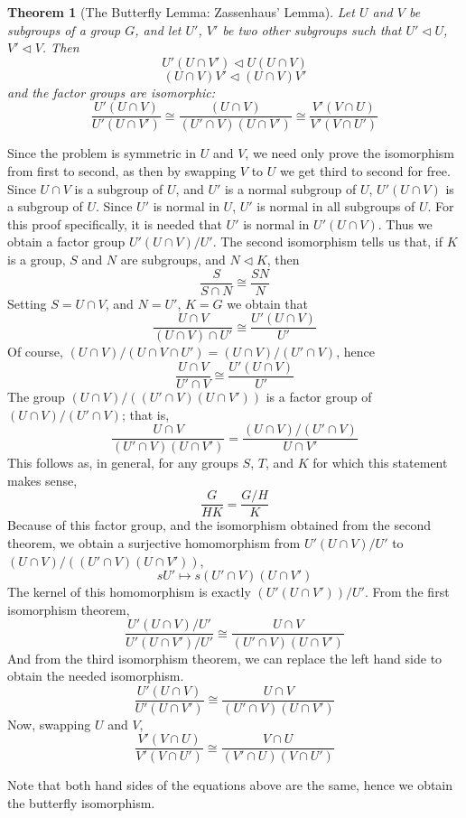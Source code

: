 \documentclass[12pt]{amsbook}
\makeatletter
\theoremstyle{plain}
\newtheorem{theorem}{Theorem}[chapter]
\theoremstyle{definition}
\renewenvironment{proof}[1][\proofname]{\par
  \pushQED{\qed}%
  \normalfont \topsep6\p@\@plus6\p@\relax
  \list{}{\leftmargin=0em
          \rightmargin=\leftmargin
          \settowidth{\itemindent}{\itshape#1}%
          \labelwidth=\itemindent}

  \item[\hskip\labelsep
        \itshape
    #1\@addpunct{.}]\ignorespaces
}{%
  \popQED\endlist\@endpefalse
}
\makeatother
\begin{document}
\begin{theorem}[The Butterfly Lemma: Zassenhaus' Lemma]  
    Let $U$ and $V$ be subgroups of a group $G$, and let $U'$, $V'$ be two other subgroups such that $U' \lhd U$, $V' \lhd V$. Then
    \[ U'(U \cap V') \lhd U(U \cap V) \]
    \[ (U \cap V)V' \lhd (U \cap V)V' \]
    and the factor groups are isomorphic:
    \[ \frac{U'(U \cap V)}{U'(U \cap V')} \cong \frac{(U \cap V)}{(U' \cap V)(U \cap V')} \cong \frac{V'(V \cap U)}{V'(V \cap U')} \]
\end{theorem}
\begin{proof}
    Since the problem is symmetric in $U$ and $V$, we need only prove the isomorphism from first to second, as then by swapping $V$ to $U$ we get third to second for free. Since $U \cap V$ is a subgroup of $U$, and $U'$ is a normal subgroup of $U$, $U'(U \cap V)$ is a subgroup of $U$. Since $U'$ is normal in $U$, $U'$ is normal in all subgroups of $U$. For this proof specifically, it is needed that $U'$ is normal in $U'(U \cap V)$. Thus we obtain a factor group $U'(U \cap V)/U'$. The second isomorphism tells us that, if $K$ is a group, $S$ and $N$ are subgroups, and $N \lhd K$, then
    \[ \frac{S}{S \cap N} \cong \frac{SN}{N} \]
    Setting $S = U \cap V$, and $N = U'$, $K = G$ we obtain that
    \[ \frac{U \cap V}{(U \cap V) \cap U'} \cong \frac{U'(U \cap V)}{U'} \]
    Of course, $(U \cap V)/(U \cap V \cap U') = (U \cap V)/(U' \cap V)$, hence
    \[ \frac{U \cap V}{U' \cap V} \cong \frac{U'(U \cap V)}{U'} \]
    The group $(U \cap V)/((U' \cap V)(U \cap V'))$ is a factor group of $(U \cap V)/(U' \cap V)$; that is,
    \[ \frac{U \cap V}{(U' \cap V)(U \cap V')} = \frac{(U \cap V)/(U' \cap V)}{U \cap V'} \]
    This follows as, in general, for any groups $S$, $T$, and $K$ for which this statement makes sense,
    \[ \frac{G}{HK} = \frac{G/H}{K} \]
    Because of this factor group, and the isomorphism obtained from the second theorem, we obtain a surjective homomorphism from $U'(U \cap V)/U'$ to $(U \cap V)/((U' \cap V)(U \cap V'))$,
    \[ sU' \mapsto s(U' \cap V)(U \cap V') \]
    The kernel of this homomorphism is exactly $(U'(U \cap V'))/U'$. From the first isomorphism theorem,
    \[ \frac{U'(U \cap V)/U'}{U'(U \cap V')/U'} \cong \frac{U \cap V}{(U' \cap V)(U \cap V')}  \]
    And from the third isomorphism theorem, we can replace the left hand side to obtain the needed isomorphism.
    \[ \frac{U'(U \cap V)}{U'(U \cap V')} \cong \frac{U \cap V}{(U' \cap V)(U \cap V')} \]
    Now, swapping $U$ and $V$,
    \[ \frac{V'(V \cap U)}{V'(V \cap U')} \cong \frac{V \cap U}{(V' \cap U)(V \cap U')} \]

    Note that both hand sides of the equations above are the same, hence we obtain the butterfly isomorphism.
\end{proof}
\end{document}
